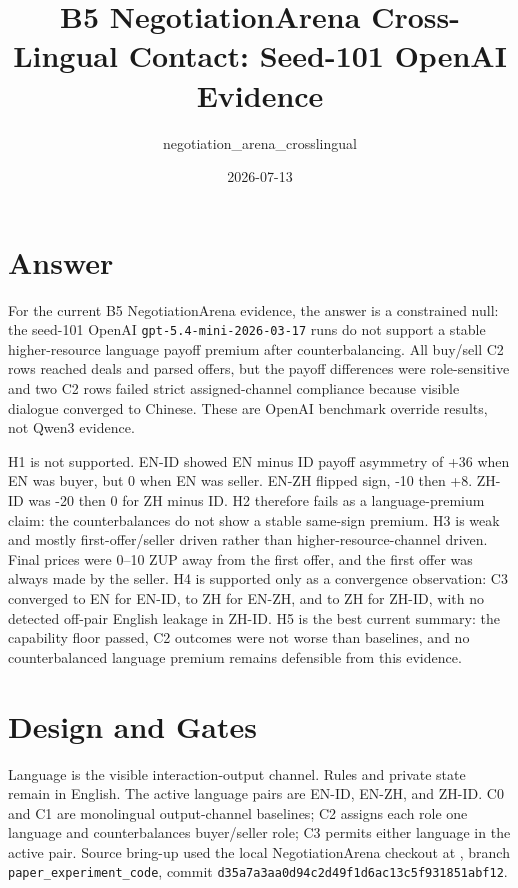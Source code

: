 \documentclass[10pt]{article}
\title{B5 NegotiationArena Cross-Lingual Contact: Seed-101 OpenAI Evidence}
\author{negotiation\_arena\_crosslingual}
\date{2026-07-13}
\newcommand{\artifact}[1]{\path{#1}}
\begin{document}
\maketitle

\section*{Answer}

For the current B5 NegotiationArena evidence, the answer is a constrained null:
the seed-101 OpenAI \texttt{gpt-5.4-mini-2026-03-17} runs do not support a
stable higher-resource language payoff premium after counterbalancing. All
buy/sell C2 rows reached deals and parsed offers, but the payoff differences
were role-sensitive and two C2 rows failed strict assigned-channel compliance
because visible dialogue converged to Chinese. These are OpenAI benchmark
override results, not Qwen3 evidence.

H1 is not supported. EN-ID showed EN minus ID payoff asymmetry of +36 when EN
was buyer, but 0 when EN was seller. EN-ZH flipped sign, -10 then +8. ZH-ID was
-20 then 0 for ZH minus ID. H2 therefore fails as a language-premium claim:
the counterbalances do not show a stable same-sign premium. H3 is weak and
mostly first-offer/seller driven rather than higher-resource-channel driven.
Final prices were 0--10 ZUP away from the first offer, and the first offer was
always made by the seller. H4 is supported only as a convergence observation:
C3 converged to EN for EN-ID, to ZH for EN-ZH, and to ZH for ZH-ID, with no
detected off-pair English leakage in ZH-ID. H5 is the best current summary:
the capability floor passed, C2 outcomes were not worse than baselines, and no
counterbalanced language premium remains defensible from this evidence.

\section*{Design and Gates}

Language is the visible interaction-output channel. Rules and private state
remain in English. The active language pairs are EN-ID, EN-ZH, and ZH-ID. C0
and C1 are monolingual output-channel baselines; C2 assigns each role one
language and counterbalances buyer/seller role; C3 permits either language in
the active pair. Source bring-up used the local NegotiationArena checkout at
\artifact{external/NegotiationArena}, branch \texttt{paper\_experiment\_code},
commit \texttt{d35a7a3aa0d94c2d49f1d6ac13c5f931851abf12}.
\end{document}
